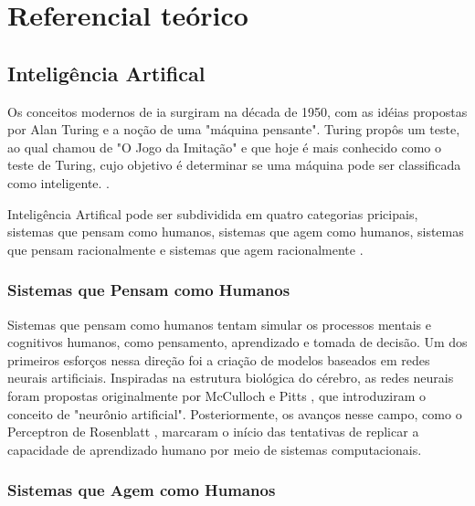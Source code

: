 \chapter{Referencial te\'orico}\label{cap:referencialTeorico}

\section{Inteligência Artifical}\label{sec:ia}

Os conceitos modernos de \gls{ia} surgiram na década de 1950, com as idéias propostas por Alan Turing e a noção de uma "máquina pensante". Turing propôs um teste, ao qual chamou de "O Jogo da Imitação" e que hoje é mais conhecido como o teste de Turing, cujo objetivo é determinar se uma máquina pode ser classificada como inteligente. \cite{Turing1950}.

Inteligência Artifical pode ser subdividida em quatro categorias pricipais, sistemas que pensam como humanos, sistemas que agem como humanos, sistemas que pensam racionalmente e sistemas que agem racionalmente \cite{RussellIA2021}.

\subsection{Sistemas que Pensam como Humanos}\label{subsec:ia1}

Sistemas que pensam como humanos tentam simular os processos mentais e cognitivos humanos, como pensamento, aprendizado e tomada de decisão. Um dos primeiros esforços nessa direção foi a criação de modelos baseados em redes neurais artificiais. Inspiradas na estrutura biológica do cérebro, as redes neurais foram propostas originalmente por McCulloch e Pitts \cite{McCulloch1943}, que introduziram o conceito de "neurônio artificial". Posteriormente, os avanços nesse campo, como o Perceptron de Rosenblatt \cite{Rosenblatt1958}, marcaram o início das tentativas de replicar a capacidade de aprendizado humano por meio de sistemas computacionais.

\subsection{Sistemas que Agem como Humanos}\label{subsec:ia2}

